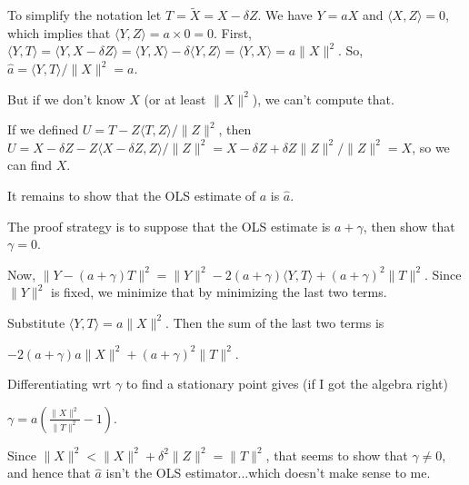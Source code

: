 \documentclass[12pt]{article}
\begin{document}
To simplify the notation let $T = \tilde{X} = X - \delta Z$.  
We have $Y = aX$ and $\langle X,Z\rangle  = 0$, which implies that $\langle Y, Z\rangle  = a \times 0 = 0$.
First, 
$\langle Y, T\rangle  = \langle Y, X - \delta Z\rangle  = \langle Y, X\rangle  - \delta\langle Y, Z\rangle  = \langle Y, X\rangle  = a \|X\|^2.$
So, $\hat{a} = \langle Y, T\rangle /\|X\|^2 = a$. 

But if we don't know $X$ (or at least $\|X\|^2$), we can't compute that.

If we defined $U = T - Z\langle T, Z\rangle /\|Z\|^2$, then
$U = X - \delta Z - Z \langle X - \delta Z, Z\rangle /\|Z\|^2 = X - \delta Z + \delta Z \|Z\|^2/\|Z\|^2 = X$,
so we can find $X$.

It remains to show that the OLS estimate of $a$ is $\hat{a}$.

The proof strategy is to suppose that the OLS estimate is $a+\gamma$, then show that $\gamma = 0$.

Now,
$\| Y - (a+\gamma) T\|^2 = \|Y\|^2 -2(a+\gamma)\langle Y, T\rangle  + (a+\gamma)^2 \|T\|^2$.
Since $\|Y\|^2$ is fixed, we minimize that by minimizing the last two terms. 

Substitute $\langle Y, T\rangle  = a \|X\|^2$.  Then the sum of the last two terms is

$-2(a+\gamma)a \|X\|^2 + (a+\gamma)^2 \|T\|^2$.

Differentiating wrt $\gamma$ to find a stationary point gives (if I got the algebra right)

$\gamma = a \left ( \frac{\|X\|^2}{\|T\|^2} - 1 \right )$.

Since $\|X\|^2 < \|X\|^2 + \delta^2 \|Z\|^2 = \|T\|^2$, that seems to show that $\gamma \ne 0$, and hence that $\hat{a}$ isn't the OLS estimator...which doesn't make sense to me.




\end{document}
